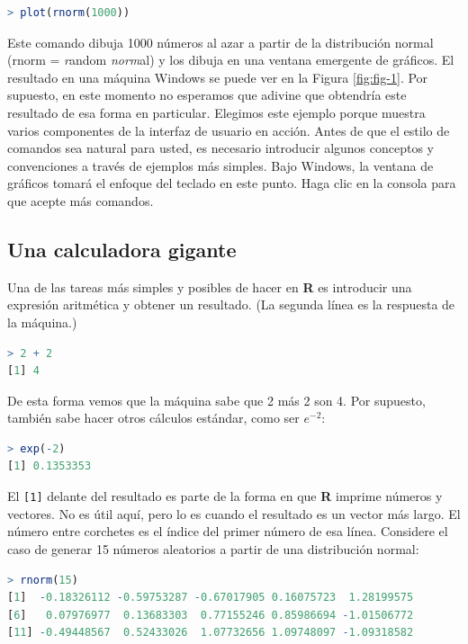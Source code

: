 \begin{lstlisting}[language=R]
> plot(rnorm(1000))
\end{lstlisting}

Este comando dibuja 1000 números al azar a partir de la distribución normal
(rnorm = \emph{r}andom \emph{norm}al) y los dibuja en una ventana emergente de
gráficos. El resultado en una máquina Windows se puede ver en la Figura
\ref{fig:fig-1}.  Por supuesto, en este momento no esperamos que adivine que
obtendría este resultado de esa forma en particular. Elegimos este ejemplo
porque muestra varios componentes de la interfaz de usuario en acción. Antes de
que el estilo de comandos sea natural para usted, es necesario introducir
algunos conceptos y convenciones a través de ejemplos más simples. Bajo
Windows, la ventana de gráficos tomará el enfoque del teclado en este punto.
Haga clic en la consola para que acepte más comandos.

\subsection{Una calculadora gigante}

Una de las tareas más simples y posibles de hacer en \textbf{R} es introducir una
expresión aritmética y obtener un resultado. (La segunda línea es la respuesta
de la máquina.)

\begin{lstlisting}[language=R]
> 2 + 2
[1] 4
\end{lstlisting}

De esta forma vemos que la máquina sabe que 2 más 2 son 4. Por supuesto,
también sabe hacer otros cálculos estándar, como ser $e^{-2}$:

\begin{lstlisting}[language=R]
> exp(-2)
[1] 0.1353353
\end{lstlisting}

El \texttt{{[}1{]}} delante del resultado es parte de la forma en
que \textbf{R} imprime números
y vectores. No es útil aquí, pero lo es cuando el resultado es un
vector más largo. El número entre corchetes es el índice del primer
número de esa línea. Considere el caso de generar 15 números aleatorios
a partir de una distribución normal:

\begin{lstlisting}[language=R]
> rnorm(15)
[1]  -0.18326112 -0.59753287 -0.67017905 0.16075723  1.28199575
[6]   0.07976977  0.13683303  0.77155246 0.85986694 -1.01506772
[11] -0.49448567  0.52433026  1.07732656 1.09748097 -1.09318582
\end{lstlisting}

